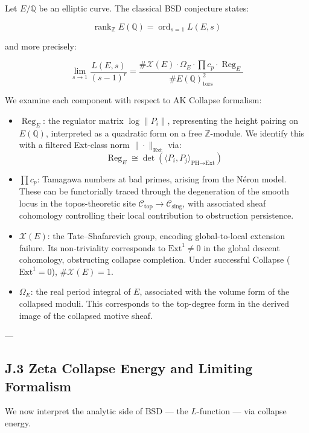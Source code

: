 \documentclass[11pt]{article}
\newcommand{\Sha}{\mathcal{X}}
\begin{document}
Let $E/\mathbb{Q}$ be an elliptic curve. The classical BSD conjecture states:

\[
\operatorname{rank}_{\mathbb{Z}} E(\mathbb{Q}) = \operatorname{ord}_{s=1} L(E,s)
\]

and more precisely:

\[
\lim_{s \to 1} \frac{L(E,s)}{(s-1)^r} = \frac{\#\Sha(E)\cdot \Omega_E \cdot \prod c_p \cdot \operatorname{Reg}_E}{\# E(\mathbb{Q})_\text{tors}^2}
\]

We examine each component with respect to AK Collapse formalism:

\begin{itemize}
  \item $\operatorname{Reg}_E$: the regulator matrix $\log \|P_i\|$, representing the height pairing on $E(\mathbb{Q})$, interpreted as a quadratic form on a free $\mathbb{Z}$-module. We identify this with a filtered Ext-class norm $\|\cdot\|_{\text{Ext}}$ via:
  \[
  \operatorname{Reg}_E \cong \det\left( \langle P_i, P_j \rangle_{\text{PH} \to \text{Ext}} \right)
  \]
  
  \item $\prod c_p$: Tamagawa numbers at bad primes, arising from the Néron model. These can be functorially traced through the degeneration of the smooth locus in the topos-theoretic site $\mathcal{C}_{\text{top}} \to \mathcal{C}_{\text{sing}}$, with associated sheaf cohomology controlling their local contribution to obstruction persistence.

  \item $\Sha(E)$: the Tate–Shafarevich group, encoding global-to-local extension failure. Its non-triviality corresponds to $\mathrm{Ext}^1 \neq 0$ in the global descent cohomology, obstructing collapse completion. Under successful Collapse ($\mathrm{Ext}^1 = 0$), $\#\Sha(E) = 1$.

  \item $\Omega_E$: the real period integral of $E$, associated with the volume form of the collapsed moduli. This corresponds to the top-degree form in the derived image of the collapsed motive sheaf.
\end{itemize}

---

\subsection*{J.3 Zeta Collapse Energy and Limiting Formalism}

We now interpret the analytic side of BSD — the $L$-function — via collapse energy.
\end{document}

